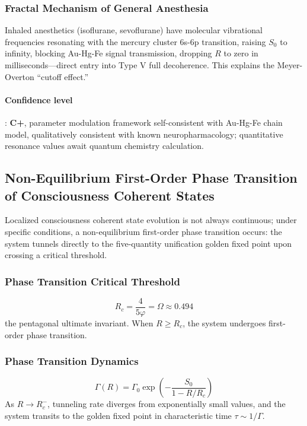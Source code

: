 \documentclass[12pt,a4paper,twocolumn]{article}
\renewcommand{\phi}{\varphi}
\begin{document}
\subsubsection{Fractal Mechanism of General Anesthesia}
Inhaled anesthetics (isoflurane, sevoflurane) have molecular vibrational frequencies resonating with the mercury cluster 6s-6p transition, raising $S_0$ to infinity, blocking Au-Hg-Fe signal transmission, dropping $R$ to zero in milliseconds---direct entry into Type V full decoherence. This explains the Meyer-Overton ``cutoff effect.''

\paragraph{Confidence level}: \textbf{C+}, parameter modulation framework self-consistent with Au-Hg-Fe chain model, qualitatively consistent with known neuropharmacology; quantitative resonance values await quantum chemistry calculation.


\subsection{Non-Equilibrium First-Order Phase Transition of Consciousness Coherent States}
\label{subsec:consciousness_phase_transition}
Localized consciousness coherent state evolution is not always continuous; under specific conditions, a non-equilibrium first-order phase transition occurs: the system tunnels directly to the five-quantity unification golden fixed point upon crossing a critical threshold.

\subsubsection{Phase Transition Critical Threshold}
\begin{equation}
R_c = \frac{4}{5\phi} = \Omega \approx 0.494
\end{equation}
the pentagonal ultimate invariant. When $R\geq R_c$, the system undergoes first-order phase transition.

\subsubsection{Phase Transition Dynamics}
\begin{equation}
\Gamma(R) = \Gamma_0 \exp\left( -\frac{S_0}{1-R/R_c} \right)
\end{equation}
As $R\to R_c^-$, tunneling rate diverges from exponentially small values, and the system transits to the golden fixed point in characteristic time $\tau\sim1/\Gamma$.
\end{document}
